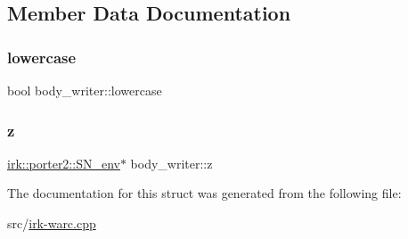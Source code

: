\subsection{Member Data Documentation}
\mbox{\label{structbody__writer_a6df150a131f73f0174993cf6c496312f}} 
\subsubsection{\texorpdfstring{lowercase}{lowercase}}
{\footnotesize\ttfamily bool body\+\_\+writer\+::lowercase}

\mbox{\label{structbody__writer_a4bf261cc5299b2eae268e0ed61bb17d6}} 
\subsubsection{\texorpdfstring{z}{z}}
{\footnotesize\ttfamily \mbox{\hyperlink{structirk_1_1porter2_1_1SN__env}{irk\+::porter2\+::\+S\+N\+\_\+env}}$\ast$ body\+\_\+writer\+::z}



The documentation for this struct was generated from the following file\+:\begin{DoxyCompactItemize}
\item 
src/\mbox{\hyperlink{irk-warc_8cpp}{irk-\/warc.\+cpp}}\end{DoxyCompactItemize}
